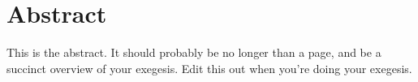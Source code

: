 \chapter*{Abstract}
 
This is the abstract. 
It should probably be no longer than a page, and be a succinct overview of your exegesis.
Edit this out when you're doing your exegesis.

\lipsum[5]